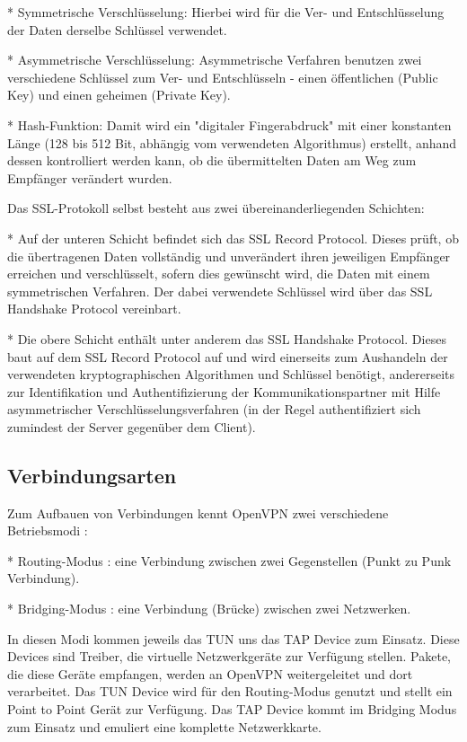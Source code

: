 \documentclass[12pt]{scrartcl}
\begin{document}
* Symmetrische Verschlüsselung: Hierbei wird für die Ver- und Entschlüsselung der Daten derselbe Schlüssel  verwendet.

* Asymmetrische Verschlüsselung: Asymmetrische Verfahren benutzen zwei verschiedene Schlüssel zum Ver- und Entschlüsseln - einen öffentlichen (Public Key) und einen geheimen (Private Key).

* Hash-Funktion: Damit wird ein "digitaler Fingerabdruck" mit einer konstanten Länge (128 bis 512 Bit, abhängig vom verwendeten Algorithmus) erstellt, anhand dessen kontrolliert werden kann, ob die übermittelten Daten am Weg zum Empfänger verändert wurden.

Das SSL-Protokoll selbst besteht aus zwei übereinanderliegenden Schichten:

* Auf der unteren Schicht befindet sich das SSL Record Protocol. Dieses prüft, ob die übertragenen Daten vollständig und unverändert ihren jeweiligen Empfänger erreichen und verschlüsselt, sofern dies gewünscht wird, die Daten mit einem symmetrischen Verfahren. Der dabei verwendete Schlüssel wird über das SSL Handshake Protocol vereinbart.

* Die obere Schicht enthält unter anderem das SSL Handshake Protocol. Dieses baut auf dem SSL Record Protocol auf und wird einerseits zum Aushandeln der verwendeten kryptographischen Algorithmen und Schlüssel benötigt, andererseits zur Identifikation und Authentifizierung der Kommunikationspartner mit Hilfe asymmetrischer Verschlüsselungsverfahren (in der Regel authentifiziert sich zumindest der Server gegenüber dem Client).

\subsection{Verbindungsarten}

Zum Aufbauen von Verbindungen kennt OpenVPN zwei verschiedene Betriebsmodi :

* Routing-Modus : eine Verbindung zwischen zwei Gegenstellen (Punkt zu Punk Verbindung).

* Bridging-Modus : eine Verbindung (Brücke) zwischen zwei Netzwerken.

In diesen Modi kommen jeweils das TUN uns das TAP Device zum Einsatz. Diese Devices sind Treiber, die virtuelle Netzwerkgeräte zur Verfügung stellen. Pakete, die diese Geräte empfangen, werden an OpenVPN weitergeleitet und dort verarbeitet. Das TUN Device wird für den Routing-Modus genutzt und stellt ein Point to Point Gerät zur Verfügung. Das TAP Device kommt im Bridging Modus zum Einsatz und emuliert eine komplette Netzwerkkarte. 
\end{document}
